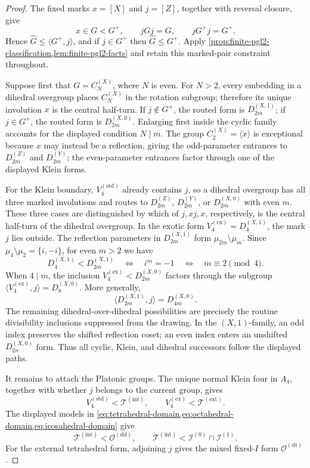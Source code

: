 \documentclass[11pt,letterpaper,onecolumn]{article}
\theoremstyle{plain}
\theoremstyle{definition}
\theoremstyle{remark}
\newcommand{\DihZ}[1]{{D_{#1}^{(Z)}}}
\newcommand{\DihY}[1]{{D_{#1}^{(Y)}}}
\newcommand{\DihXzero}[1]{{D_{#1}^{(X,0)}}}
\newcommand{\DihXone}[1]{{D_{#1}^{(X,1)}}}
\newcommand{\CycX}[1]{{C_{#1}^{(X)}}}
\newcommand{\KleinStd}{{V_4^{(\mathrm{std})}}}
\newcommand{\KleinEx}{{V_4^{(\mathrm{ex})}}}
\newcommand{\TetInt}{{\mathcal T^{(\mathrm{int})}}}
\newcommand{\TetExt}{{\mathcal T^{(\mathrm{ext})}}}
\newcommand{\OctDD}{{\mathcal O^{(\mathrm{dd})}}}
\newcommand{\OctDT}{{\mathcal O^{(\mathrm{dt})}}}
\newcommand{\IcoZero}{{\mathcal I^{(0)}}}
\newcommand{\IcoOne}{{\mathcal I^{(1)}}}
\begin{document}
\begin{proof}
The fixed marks \(x=[X]\) and \(j=[Z]\), together with reversal closure, give
\[
 x\in G<G^+,
 \qquad jGj=G,
 \qquad jG^+j=G^+.
\]
Hence \(\widehat G\le\langle G^+,j\rangle\), and if \(j\in G^+\) then
\(\widehat G\le G^+\).  Apply
\cref{prop:finite-pgl2-classification,lem:finite-pgl2-facts} and retain this
marked-pair constraint throughout.

Suppose first that \(G=\CycX{N}\), where \(N\) is even.  For \(N>2\), every
embedding in a dihedral overgroup places \(\CycX{N}\) in the rotation subgroup;
therefore its unique involution \(x\) is the central half-turn.  If
  \(j\notin G^+\), the routed form is \(\DihXone{2m}\); if \(j\in G^+\),
  the routed form is \(\DihXzero{2m}\).  Enlarging first inside the cyclic family accounts for
the displayed condition \(N\mid m\).  The group \(\CycX{2}=\langle x\rangle\)
is exceptional because \(x\) may instead be a reflection, giving the
odd-parameter entrances to \(\DihZ{2m}\) and \(\DihY{2m}\); the
even-parameter entrances factor through one of the displayed Klein forms.

For the Klein boundary, \(\KleinStd\) already contains \(j\), so a
dihedral overgroup has all three marked involutions and routes to
\(\DihZ{2m}\), \(\DihY{2m}\), or \(\DihXzero{2m}\) with even \(m\).
These three cases are distinguished by which of \(j,xj,x\), respectively,
is the central half-turn of the dihedral overgroup.  In the exotic
form \(\KleinEx=\DihXone{4}\), the mark \(j\) lies outside.
The reflection parameters in \(\DihXone{2m}\) form \(\mu_{2m}\setminus\mu_m\).
Since \(\mu_4\setminus\mu_2=\{i,-i\}\), for even \(m>2\) we have
\[
 \DihXone{4}<\DihXone{2m}
 \quad\Longleftrightarrow\quad
 i^m=-1
 \quad\Longleftrightarrow\quad
 m\equiv2\pmod4.
\]
When \(4\mid m\), the inclusion \(\KleinEx<\DihXzero{2m}\) factors
through the subgroup \(\langle\KleinEx,j\rangle=\DihXzero{8}\).
More generally,
\[
  \langle\DihXone{2m},j\rangle=\DihXzero{4m}.
\]
The remaining dihedral-over-dihedral possibilities are precisely the
routine divisibility inclusions suppressed from the drawing.  In the
  \((X,1)\)-family, an odd index preserves the shifted reflection coset;
  an even index enters an unshifted \(\DihXzero{2n}\) form.  Thus all cyclic, Klein, and dihedral
successors follow the displayed paths.

It remains to attach the Platonic groups.  The unique normal Klein four in
\(A_4\), together with whether \(j\) belongs to the current group, gives
\[
 \KleinStd<\TetInt,
 \qquad
 \KleinEx<\TetExt.
\]
The displayed models in
\cref{eq:tetrahedral-domain,eq:octahedral-domain,eq:icosahedral-domain}
give
\[
 \TetInt<\OctDD,
 \qquad
 \TetInt<\IcoZero\cap\IcoOne.
\]
For the external tetrahedral form, adjoining \(j\) gives the mixed fixed-\(I\)
form \(\OctDT\).


\end{proof}
\end{document}
